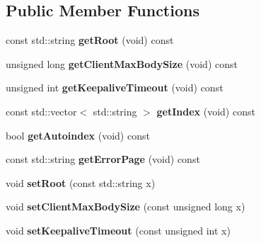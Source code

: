 \subsection*{Public Member Functions}
\begin{DoxyCompactItemize}
\item 
\mbox{\label{classft_1_1BaseDirectives_a0b123f9450a95e0fb067d4135b28ce62}} 
const std\+::string {\bfseries get\+Root} (void) const
\item 
\mbox{\label{classft_1_1BaseDirectives_a4fd2d5d846d3d5ce76454ae6c3e0d0f5}} 
unsigned long {\bfseries get\+Client\+Max\+Body\+Size} (void) const
\item 
\mbox{\label{classft_1_1BaseDirectives_ad2e174f28417a2036c227e97b357f90d}} 
unsigned int {\bfseries get\+Keepalive\+Timeout} (void) const
\item 
\mbox{\label{classft_1_1BaseDirectives_a72a11c122a7c549a3267781675fb8f11}} 
const std\+::vector$<$ std\+::string $>$ {\bfseries get\+Index} (void) const
\item 
\mbox{\label{classft_1_1BaseDirectives_ac763b5754a79ea0138614177635d4e61}} 
bool {\bfseries get\+Autoindex} (void) const
\item 
\mbox{\label{classft_1_1BaseDirectives_aa333517dacdf41961f846c6aaa612ff4}} 
const std\+::string {\bfseries get\+Error\+Page} (void) const
\item 
\mbox{\label{classft_1_1BaseDirectives_a75dab44e33dc959e2ef4e6fd2525b2b7}} 
void {\bfseries set\+Root} (const std\+::string x)
\item 
\mbox{\label{classft_1_1BaseDirectives_a5ca6e945a7e8636b17bbd108c3992781}} 
void {\bfseries set\+Client\+Max\+Body\+Size} (const unsigned long x)
\item 
\mbox{\label{classft_1_1BaseDirectives_acf0c6dd68df768ddd33af23f00883245}} 
void {\bfseries set\+Keepalive\+Timeout} (const unsigned int x)
\item 

\end{DoxyCompactItemize}
